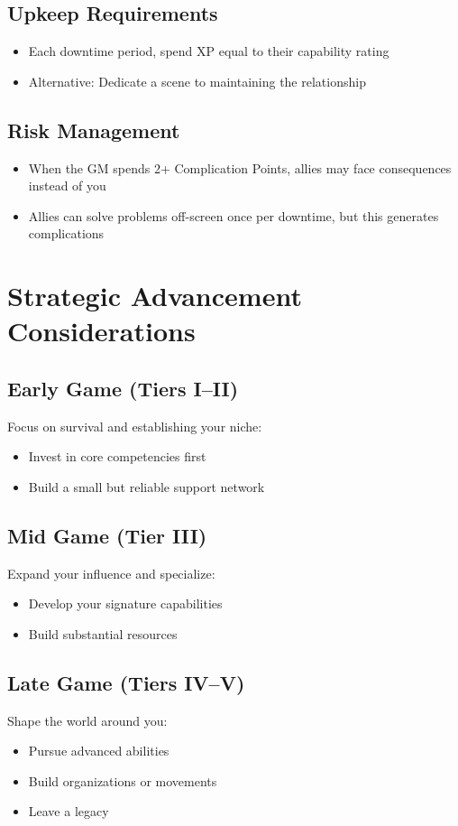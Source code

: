 \begin{multicols}{2}
\subsection*{Upkeep Requirements}
\begin{itemize}
\item Each downtime period, spend XP equal to their capability rating
\item Alternative: Dedicate a scene to maintaining the relationship
\end{itemize}

\subsection*{Risk Management}
\begin{itemize}
\item When the GM spends 2+ Complication Points, allies may face consequences instead of you
\item Allies can solve problems off-screen once per downtime, but this generates complications
\end{itemize}

\section{Strategic Advancement Considerations}

\subsection*{Early Game (Tiers I–II)}
Focus on survival and establishing your niche:
\begin{itemize}
\item Invest in core competencies first
\item Build a small but reliable support network
\end{itemize}

\subsection*{Mid Game (Tier III)}
Expand your influence and specialize:
\begin{itemize}
\item Develop your signature capabilities
\item Build substantial resources
\end{itemize}

\subsection*{Late Game (Tiers IV–V)}
Shape the world around you:
\begin{itemize}
\item Pursue advanced abilities
\item Build organizations or movements
\item Leave a legacy
\end{itemize}


\end{multicols}
